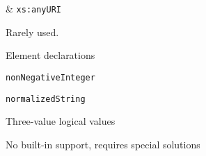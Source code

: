 \begin{table*}[t]
\begin{threeparttable}
\begin{tabu}
                & \texttt{xs:anyURI}      %
            \\
            \hline
        \end{tabu}
        \begin{tablenotes}
          \item\label{tn:rarely-used} Rarely used.
          \item\label{tn:a} Element declarations
          \item\label{tn:xsd-nonNegInt} \texttt{nonNegativeInteger}
          \item\label{tn:normString} \texttt{normalizedString}
          \item\label{tn:logical} Three-value logical values
          \item\label{no-built-in-support} No built-in support, requires special solutions
        \end{tablenotes}
    \end{threeparttable}    
\end{table*}




















